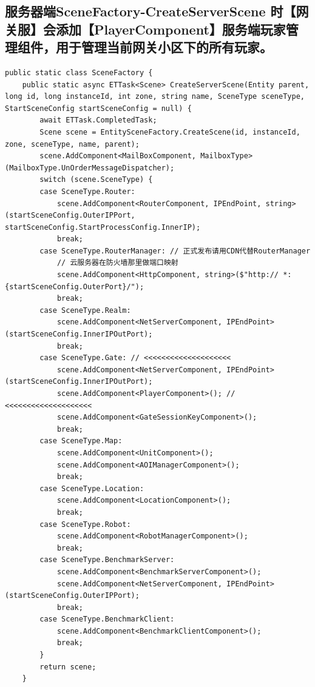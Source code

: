 \documentclass[9pt, b5paper]{article}
\begin{document}
\subsection{服务器端SceneFactory-CreateServerScene 时【网关服】会添加【PlayerComponent】服务端玩家管理组件，用于管理当前网关小区下的所有玩家。}
\label{sec-9-6}
\begin{verbatim}
public static class SceneFactory {
    public static async ETTask<Scene> CreateServerScene(Entity parent, long id, long instanceId, int zone, string name, SceneType sceneType, StartSceneConfig startSceneConfig = null) {
        await ETTask.CompletedTask;
        Scene scene = EntitySceneFactory.CreateScene(id, instanceId, zone, sceneType, name, parent);
        scene.AddComponent<MailBoxComponent, MailboxType>(MailboxType.UnOrderMessageDispatcher);
        switch (scene.SceneType) {
        case SceneType.Router:
            scene.AddComponent<RouterComponent, IPEndPoint, string>(startSceneConfig.OuterIPPort, startSceneConfig.StartProcessConfig.InnerIP);
            break;
        case SceneType.RouterManager: // 正式发布请用CDN代替RouterManager
            // 云服务器在防火墙那里做端口映射
            scene.AddComponent<HttpComponent, string>($"http:// *:{startSceneConfig.OuterPort}/");
            break;
        case SceneType.Realm:
            scene.AddComponent<NetServerComponent, IPEndPoint>(startSceneConfig.InnerIPOutPort);
            break;
        case SceneType.Gate: // <<<<<<<<<<<<<<<<<<<< 
            scene.AddComponent<NetServerComponent, IPEndPoint>(startSceneConfig.InnerIPOutPort);
            scene.AddComponent<PlayerComponent>(); // <<<<<<<<<<<<<<<<<<<< 
            scene.AddComponent<GateSessionKeyComponent>();
            break;
        case SceneType.Map:
            scene.AddComponent<UnitComponent>();
            scene.AddComponent<AOIManagerComponent>();
            break;
        case SceneType.Location:
            scene.AddComponent<LocationComponent>();
            break;
        case SceneType.Robot:
            scene.AddComponent<RobotManagerComponent>();
            break;
        case SceneType.BenchmarkServer:
            scene.AddComponent<BenchmarkServerComponent>();
            scene.AddComponent<NetServerComponent, IPEndPoint>(startSceneConfig.OuterIPPort);
            break;
        case SceneType.BenchmarkClient:
            scene.AddComponent<BenchmarkClientComponent>();
            break;
        }
        return scene;
    }
\end{verbatim}
\end{document}

